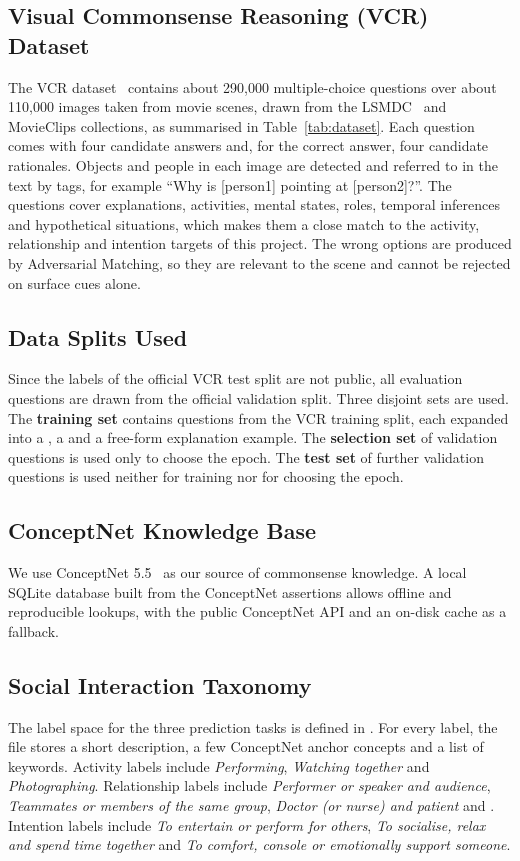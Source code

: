 \subsection{Visual Commonsense Reasoning (VCR) Dataset}
The VCR dataset~\cite{zellers2019vcr} contains about 290,000 multiple-choice questions over about 110,000 images taken from movie scenes, drawn from the LSMDC~\cite{rohrbach2017lsmdc} and MovieClips collections, as summarised in Table~\ref{tab:dataset}. Each question comes with four candidate answers and, for the correct answer, four candidate rationales. Objects and people in each image are detected and referred to in the text by tags, for example ``Why is [person1] pointing at [person2]?''. The questions cover explanations, activities, mental states, roles, temporal inferences and hypothetical situations, which makes them a close match to the activity, relationship and intention targets of this project. The wrong options are produced by Adversarial Matching, so they are relevant to the scene and cannot be rejected on surface cues alone.

\subsection{Data Splits Used}
Since the labels of the official VCR test split are not public, all evaluation questions are drawn from the official validation split. Three disjoint sets are used. The \textbf{training set} contains questions from the VCR training split, each expanded into a \QtoA, a \QAtoR{} and a free-form explanation example. The \textbf{selection set} of validation questions is used only to choose the epoch. The \textbf{test set} of further validation questions is used neither for training nor for choosing the epoch.

\subsection{ConceptNet Knowledge Base}
We use ConceptNet 5.5~\cite{speer2017conceptnet} as our source of commonsense knowledge. A local SQLite database built from the ConceptNet assertions allows offline and reproducible lookups, with the public ConceptNet API and an on-disk cache as a fallback.

\subsection{Social Interaction Taxonomy}
The label space for the three prediction tasks is defined in . For every label, the file stores a short description, a few ConceptNet anchor concepts and a list of keywords. Activity labels include \emph{Performing}, \emph{Watching together} and \emph{Photographing}. Relationship labels include \emph{Performer or speaker and audience}, \emph{Teammates or members of the same group}, \emph{Doctor (or nurse) and patient} and . Intention labels include \emph{To entertain or perform for others}, \emph{To socialise, relax and spend time together} and \emph{To comfort, console or emotionally support someone}.
